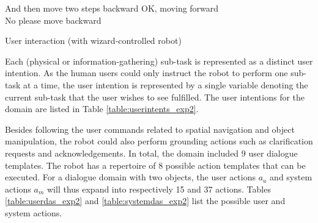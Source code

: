 \begin{Transcript}[p]
\begin{dialogue}
 \vspace{2mm}
 And then move two steps backward\vspace{2mm}
 OK, moving forward\vspace{1mm} \\
 \vspace{2mm}
 No please move backward \vspace{1mm} \\ 
 \vspace{2mm}
\end{dialogue}
\vspace{-4mm} \hspace{1cm} \vspace{3mm}
\caption{User interaction (with wizard-controlled robot)}
\end{Transcript}

Each (physical or information-gathering) sub-task is represented as a distinct user intention. As the human users could only instruct the robot to perform one sub-task at a time, the user intention is represented by a single variable denoting the current sub-task that the user wishes to see fulfilled.  The user intentions for the domain are listed in Table \ref{table:userintents_exp2}. 

Besides following the user commands related to spatial navigation and object manipulation, the robot could also perform grounding actions such as clarification requests and acknowledgements. In total, the domain included 9 user dialogue templates.  The robot has a repertoire of 8 possible action templates that can be executed.  For a dialogue domain with two objects, the user actions $a_u$ and system actions $a_m$ will thus expand into respectively 15 and 37 actions.  Tables \ref{table:userdas_exp2} and \ref{table:systemdas_exp2} list the possible user and system actions.

\renewcommand{\arraystretch}{1.3}

